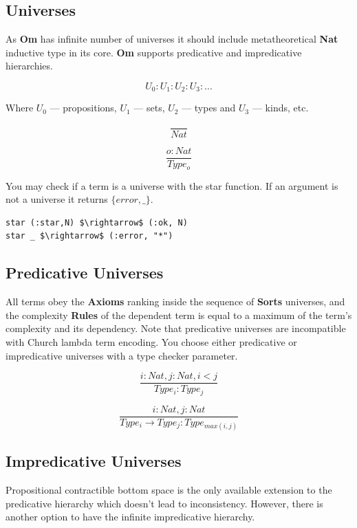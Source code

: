 \documentclass{aip-cp}
\begin{document}
\subsection{Universes}

As {\bf Om} has infinite number of universes it should include metatheoretical {\bf Nat}
inductive type in its core. {\bf Om} supports predicative and impredicative hierarchies.

$$
U_0 : U_1 : U_2 : U_3 : ...
$$

Where $U_0$ --- propositions, $U_1$ --- sets, $U_2$ --- types and $U_3$ --- kinds, etc.

\begin{equation}
\tag{I}
\dfrac
{}
{Nat}
\end{equation}

\begin{equation}
\tag{S}
\dfrac
{o : Nat}
{Type_o}
\end{equation}

You may check if a term is a universe with the star function.
If an argument is not a universe it returns $\{error,\_\}$.

\begin{lstlisting}[mathescape=true]
star (:star,N) $\rightarrow$ (:ok, N)
star _ $\rightarrow$ (:error, "*")
\end{lstlisting}

\subsection{Predicative Universes}

All terms obey the {\bf Axioms} ranking inside the sequence of {\bf Sorts} universes,
and the complexity {\bf Rules} of the dependent term is equal to a maximum of
the term's complexity and its dependency.
Note that predicative universes are incompatible with Church lambda term encoding.
You choose either predicative or impredicative universes with a type checker parameter.

\[
\tag{$A_1$}
\dfrac{i: Nat, j: Nat, i < j}{Type_i : Type_j}
\]

\[
\tag{$R_1$}
\dfrac{i : Nat, j : Nat}{Type_i \rightarrow Type_j : Type_{max(i,j)} }
\]

\subsection{Impredicative Universes}
Propositional contractible bottom space is the only
available extension to the predicative hierarchy which doesn't lead to inconsistency.
However, there is another option to have the infinite impredicative hierarchy.
\end{document}
